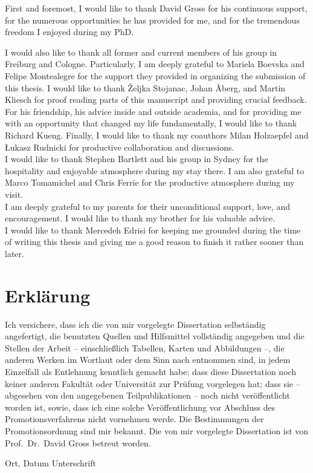 \documentclass[
  a4paper,
  11pt,
  BCOR=8mm,
  twoside,
  headsepline]{scrbook}
\begin{document}
First and foremost, I would like to thank David Gross for his continuous support, for the numerous opportunities he has provided for me, and for the tremendous freedom I enjoyed during my PhD.

I would also like to thank all former and current members of his group in Freiburg and Cologne.
Particularly, I am deeply grateful to Mariela Boevska and Felipe Montealegre for the support they provided in organizing the submission of this thesis.
I would like to thank Željka Stojanac, Johan Åberg, and Martin Kliesch for proof reading parts of this manuscript and providing crucial feedback.
For his friendship, his advice inside and outside academia, and for providing me with an opportunity that changed my life fundamentally, I would like to thank Richard Kueng.
Finally, I would like to thank my coauthors Milan Holzaepfel and Łukasz Rudnicki for productive collaboration and discussions.\\

I would like to thank Stephen Bartlett and his group in Sydney for the hospitality and enjoyable atmosphere during my stay there.
I am also grateful to Marco Tomamichel and Chris Ferrie for the productive atmosphere during my visit.\\

I am deeply grateful to my parents for their unconditional support, love, and encouragement.
I would like to thank my brother for his valuable advice.\\

I would like to thank Mercedeh Edrisi for keeping me grounded during the time of writing this thesis and giving me a good reason to finish it rather sooner than later.



\clearpage
\chapter*{Erklärung}

Ich versichere, dass ich die von mir vorgelegte Dissertation selbständig angefertigt, die benutzten Quellen und Hilfsmittel vollständig angegeben und die Stellen der Arbeit -- einschließlich Tabellen, Karten und Abbildungen --, die anderen Werken im Wortlaut oder dem Sinn nach entnommen sind, in jedem Einzelfall als Entlehnung kenntlich gemacht habe; dass diese Dissertation noch keiner anderen Fakultät oder Universität zur Prüfung vorgelegen hat; dass sie -- abgesehen von den angegebenen Teilpublikationen -- noch nicht veröffentlicht worden ist, sowie, dass ich eine solche Veröffentlichung vor Abschluss des Promotionsverfahrens nicht vornehmen werde.
Die Bestimmungen der Promotionsordnung sind mir bekannt.
Die von mir vorgelegte Dissertation ist von Prof.\ Dr.\ David Gross betreut worden.

\vspace{4cm}

Ort, Datum \hfill Unterschrift \hspace{2cm}


\clearpage
{}
\newpage\phantom{CLEAR PAGE}
\end{document}
